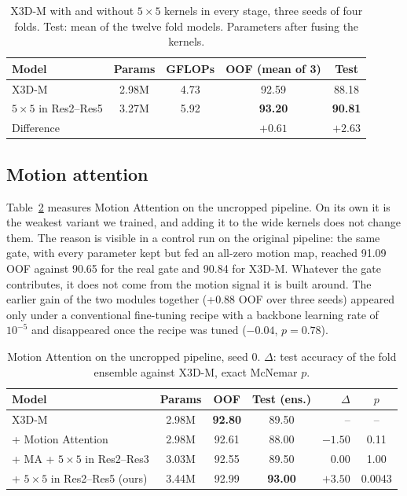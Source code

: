 \documentclass[runningheads]{llncs}
\begin{document}
\begin{table}[t]
\centering
\caption{X3D-M with and without $5\times5$ kernels in every stage, three
seeds of four folds. Test: mean of the twelve fold models. Parameters after
fusing the kernels.}
\label{tab:seeds}
\setlength{\tabcolsep}{5pt}
\begin{tabular}{lcccc}
\toprule
Model & Params & GFLOPs & OOF (mean of 3) & Test \\
\midrule
X3D-M                      & 2.98M & 4.73 & 92.59 & 88.18 \\
$5\times5$ in Res2--Res5   & 3.27M & 5.92 & \textbf{93.20} & \textbf{90.81} \\
\midrule
Difference                 &       &      & $+0.61$ & $+2.63$ \\
\bottomrule
\end{tabular}
\end{table}

\subsection{Motion attention}
\label{sec:ma-result}

Table~\ref{tab:ma} measures Motion Attention on the uncropped pipeline. On
its own it is the weakest variant we trained, and adding it to the wide
kernels does not change them. The reason is visible in a control run on the
original pipeline: the same gate, with every parameter kept but fed an
all-zero motion map, reached 91.09 OOF against 90.65 for the real gate and
90.84 for X3D-M. Whatever the gate contributes, it does not come from the
motion signal it is built around. The earlier gain of the two modules
together (+0.88 OOF over three seeds) appeared only under a conventional fine-tuning recipe
with a backbone learning rate of $10^{-5}$ and disappeared once the recipe
was tuned ($-0.04$, $p=0.78$).

\begin{table}[t]
\centering
\caption{Motion Attention on the uncropped pipeline, seed 0. $\Delta$:
test accuracy of the fold ensemble against X3D-M, exact McNemar $p$.}
\label{tab:ma}
\setlength{\tabcolsep}{5pt}
\begin{tabular}{lcccrc}
\toprule
Model & Params & OOF & Test (ens.) & $\Delta$ & $p$ \\
\midrule
X3D-M                               & 2.98M & \textbf{92.80} & 89.50 & --      & --   \\
+ Motion Attention                  & 2.98M & 92.61 & 88.00 & $-1.50$ & 0.11 \\
+ MA + $5\times5$ in Res2--Res3     & 3.03M & 92.55 & 89.50 & $0.00$  & 1.00 \\
+ $5\times5$ in Res2--Res5 (ours)   & 3.44M & 92.99 & \textbf{93.00} & $+3.50$ & 0.0043 \\
\bottomrule
\end{tabular}
\end{table}
\end{document}
